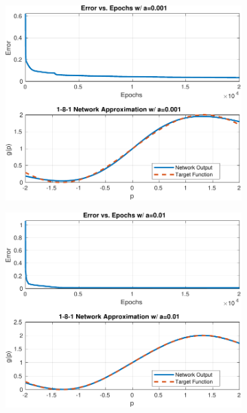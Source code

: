 \begin{figure}[htpb]
	\centering
	\begin{subfigure}{0.47\textwidth}
		\centering
		\includegraphics[width=\textwidth]{../Problem 4/nn_images/1-8-1_NN_a=0.001.pdf}
		\caption{}
	\end{subfigure}
	\hfill
	\begin{subfigure}{0.47\textwidth}
		\centering
		\includegraphics[width=\textwidth]{../Problem 4/nn_images/1-8-1_NN_a=0.01.pdf}
		\caption{}
	\end{subfigure}\\

\end{figure}

